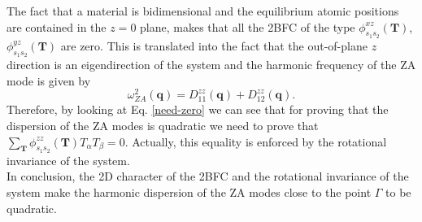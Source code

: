 The fact that a material is bidimensional and the equilibrium atomic positions are contained in the $z=0$ plane,
makes that all the 2BFC of the type $\phi_{s_{1}s_{2}}^{xz}(\mathbf{T})$, $\phi_{s_{1}s_{2}}^{yz}(\mathbf{T})$ are zero. This is translated into the fact that the out-of-plane $z$ direction is an eigendirection of the system and the 
harmonic frequency of the ZA mode is given by
\begin{equation} 
\omega_{ZA}^{2}(\mathbf{q})=D_{11}^{zz}(\mathbf{q})+D_{12}^{zz}(\mathbf{q}). 
\end{equation} 
Therefore, by looking at Eq. \ref{need-zero} we can see that for proving that the dispersion of the ZA modes is quadratic we need to prove that 
$\sum_{\mathbf{T}}\phi_{s_{1}s_{2}}^{zz}(\mathbf{T})T_{\alpha}T_{\beta}=0$. Actually, this equality is enforced by the rotational invariance of the system. \\

In conclusion, the 2D character of the 2BFC and the rotational invariance of the system make the harmonic dispersion of the ZA modes close to the point $\Gamma$ to be quadratic.

